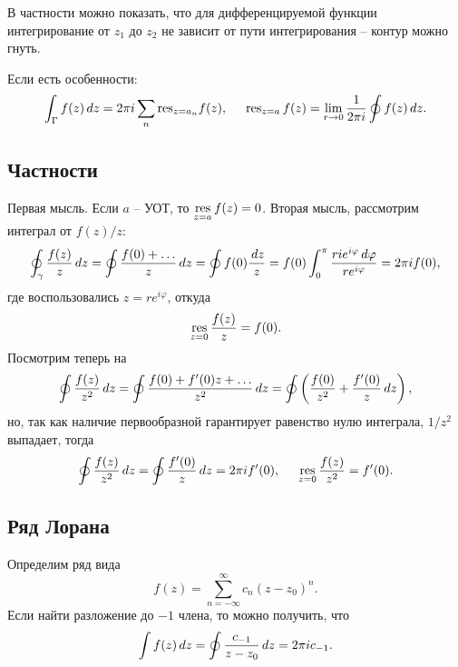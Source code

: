 В частности можно показать, что для дифференцируемой функции интегрирование от $z_1$ до $z_2$ не зависит от пути интегрирования -- контур можно гнуть.

Если есть особенности:
\begin{equation*}
    \int_\Gamma f(z) \, d z = 2 \pi i \sum_n \textnormal{res}_{z=a_n} f(z),
    \hspace{5 mm} 
    \textnormal{res}_{z=a}\, f(z) = \lim_{r \to 0} \frac{1}{2 \pi i} \oint f(z) \, d z.
\end{equation*}

\subsection*{Частности}

Первая мысль. Если $a$ -- УОТ, то $\mathop{\mathrm{res}}\limits_{z=a} f(z)= 0$. Вторая мысль, рассмотрим интеграл от $f(z)/z$:
\begin{equation*}
    \oint_\gamma \frac{f(z)}{z} \, d z = \oint \frac{f(0) + \ldots}{z} \, d z = 
    \oint f(0) \frac{\, d z}{z} = f(0) \int_{0}^{\pi} \frac{r i e^{i \varphi} \, d \varphi}{r e^{i \varphi}} = 2 \pi i f(0),
\end{equation*}
где воспользовались $z = r e^{i \varphi}$, откуда
\begin{equation*}
    \mathop{\mathrm{res}}\limits_{z=0} \frac{f(z)}{z} = f(0).
\end{equation*}
Посмотрим теперь на
\begin{equation*}
    \oint \frac{f(z)}{z^2} \, d z = \oint \frac{f(0) + f'(0) z + \ldots}{z^2} \, d z = 
    \oint \left(
        \frac{f(0)}{z^2} + \frac{f'(0)}{z} \, d z
    \right),
\end{equation*}
но, так как наличие первообразной гарантирует равенство нулю интеграла, $1/z^2$ выпадает, тогда
\begin{equation*}
    \oint \frac{f(z)}{z^2} \, d z = \oint \frac{f'(0)}{z} \, d z = 2 \pi i f'(0),
    \hspace{5 mm} 
    \mathop{\mathrm{res}}\limits_{z = 0} \frac{f(z)}{z^2} = f'(0).
\end{equation*}



\subsection*{Ряд Лорана}

Определим ряд вида
\begin{equation*}
    f(z) = \sum_{n=-\infty}^{\infty}  c_n (z-z_0)^n.
\end{equation*}
Если найти разложение до $-1$ члена, то можно получить, что
\begin{equation*}
    \int f(z) \, d z = \oint \frac{c_{-1}}{z-z_0} \, d z  = 2 \pi i c_{-1}.
\end{equation*}



